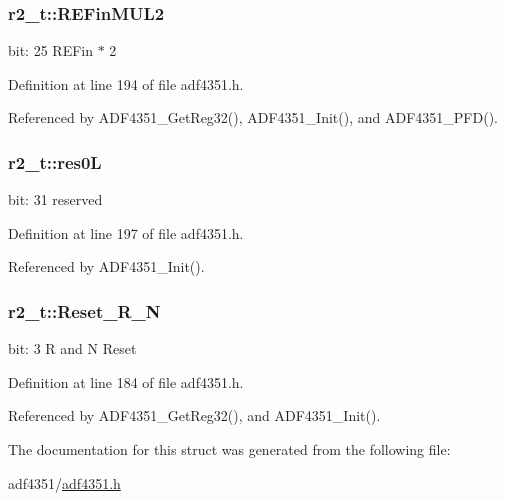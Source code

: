 \subsubsection[{\texorpdfstring{R\+E\+Fin\+M\+U\+L2}{REFinMUL2}}]{ r2\+\_\+t\+::\+R\+E\+Fin\+M\+U\+L2}\hypertarget{structr2__t_aa675f6a674217e14be9e3e1754530a78}{}\label{structr2__t_aa675f6a674217e14be9e3e1754530a78}
bit\+: 25 R\+E\+Fin $\ast$ 2 

Definition at line 194 of file adf4351.\+h.



Referenced by A\+D\+F4351\+\_\+\+Get\+Reg32(), A\+D\+F4351\+\_\+\+Init(), and A\+D\+F4351\+\_\+\+P\+F\+D().

\subsubsection[{\texorpdfstring{res0L}{res0L}}]{ r2\+\_\+t\+::res0L}\hypertarget{structr2__t_af67e412a4c526894fee5ce321dfce083}{}\label{structr2__t_af67e412a4c526894fee5ce321dfce083}
bit\+: 31 reserved 

Definition at line 197 of file adf4351.\+h.



Referenced by A\+D\+F4351\+\_\+\+Init().

\subsubsection[{\texorpdfstring{Reset\+\_\+\+R\+\_\+N}{Reset_R_N}}]{ r2\+\_\+t\+::\+Reset\+\_\+\+R\+\_\+N}\hypertarget{structr2__t_a21c5fab8a85d13d5e47de5588780b094}{}\label{structr2__t_a21c5fab8a85d13d5e47de5588780b094}
bit\+: 3 R and N Reset 

Definition at line 184 of file adf4351.\+h.



Referenced by A\+D\+F4351\+\_\+\+Get\+Reg32(), and A\+D\+F4351\+\_\+\+Init().



The documentation for this struct was generated from the following file\+:\begin{DoxyCompactItemize}
\item 
adf4351/\hyperlink{adf4351_8h}{adf4351.\+h}\end{DoxyCompactItemize}
